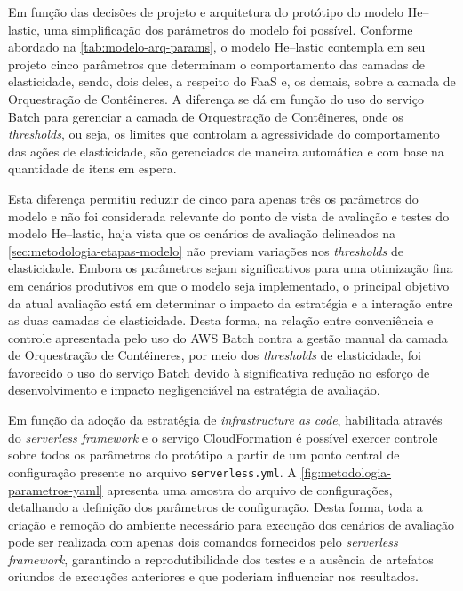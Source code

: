 \documentclass[english,brazilian]{UNISINOSmonografia} %
\begin{document}
Em função das decisões de projeto e arquitetura do protótipo do modelo \textsf{He}--lastic, uma simplificação dos parâmetros do modelo foi possível.
%
Conforme abordado na \autoref{tab:modelo-arq-params}, o modelo \textsf{He}--lastic contempla em seu projeto cinco parâmetros que determinam o comportamento das camadas de elasticidade, sendo, dois deles, a respeito do FaaS e, os demais, sobre a camada de Orquestração de Contêineres.
%
A diferença se dá em função do uso do serviço Batch para gerenciar a camada de Orquestração de Contêineres, onde os \textit{thresholds}, ou seja, os limites que controlam a agressividade do comportamento das ações de elasticidade, são gerenciados de maneira automática e com base na quantidade de itens em espera.


Esta diferença permitiu reduzir de cinco para apenas três os parâmetros do modelo e não foi considerada relevante do ponto de vista de avaliação e testes do modelo \textsf{He}--lastic, haja vista que os cenários de avaliação delineados na \autoref{sec:metodologia-etapas-modelo} não previam variações nos \textit{thresholds} de elasticidade.
%
Embora os parâmetros sejam significativos para uma otimização fina em cenários produtivos em que o modelo seja implementado, o principal objetivo da atual avaliação está em determinar o impacto da estratégia e a interação entre as duas camadas de elasticidade.
%
Desta forma, na relação entre conveniência e controle apresentada pelo uso do AWS Batch contra a gestão manual da camada de Orquestração de Contêineres, por meio dos \textit{thresholds} de elasticidade, foi favorecido o uso do serviço Batch devido à significativa redução no esforço de desenvolvimento e impacto negligenciável na estratégia de avaliação.



Em função da adoção da estratégia de \textit{infrastructure as code}, habilitada através do \textit{serverless framework} e o serviço CloudFormation é possível exercer controle sobre todos os parâmetros do protótipo a partir de um ponto central de configuração presente no arquivo \texttt{serverless.yml}.
%
A \autoref{fig:metodologia-parametros-yaml} apresenta uma amostra do arquivo de configurações, detalhando a definição dos parâmetros de configuração.
%
Desta forma, toda a criação e remoção do ambiente necessário para execução dos cenários de avaliação pode ser realizada com apenas dois comandos fornecidos pelo \textit{serverless framework}, garantindo a reprodutibilidade dos testes e a ausência de artefatos oriundos de execuções anteriores e que poderiam influenciar nos resultados.
\end{document}
